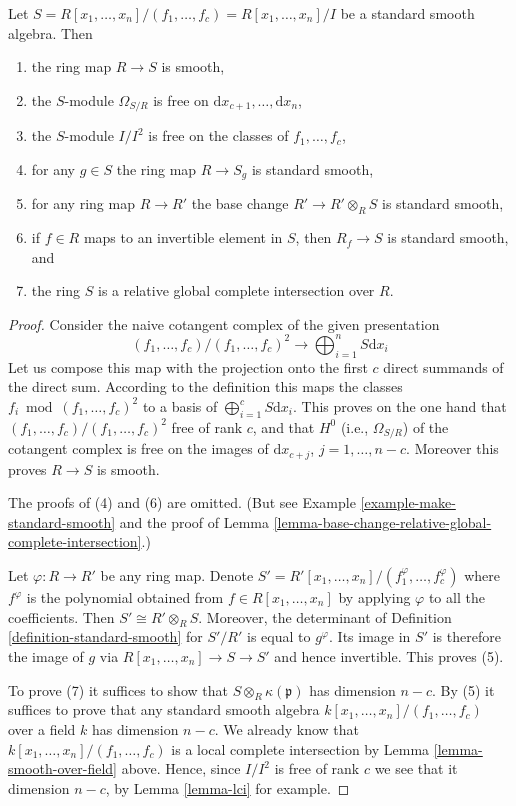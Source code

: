 \begin{lemma}
\label{lemma-standard-smooth}
Let
$S = R[x_1, \ldots, x_n]/(f_1, \ldots, f_c) = R[x_1, \ldots, x_n]/I$
be a standard smooth algebra. Then
\begin{enumerate}
\item the ring map $R \to S$ is smooth,
\item the $S$-module $\Omega_{S/R}$ is free on
$\text{d}x_{c + 1}, \ldots, \text{d}x_n$,
\item the $S$-module $I/I^2$ is free on the classes of $f_1, \ldots, f_c$,
\item for any $g \in S$ the ring map $R \to S_g$ is standard smooth,
\item for any ring map $R \to R'$ the base change
$R' \to R'\otimes_R S$ is standard smooth,
\item if $f \in R$ maps to an invertible element in $S$, then
$R_f \to S$ is standard smooth, and
\item the ring $S$ is a relative global complete intersection over $R$.
\end{enumerate}
\end{lemma}

\begin{proof}
Consider the naive cotangent complex of the given presentation
$$
(f_1, \ldots, f_c)/(f_1, \ldots, f_c)^2
\longrightarrow
\bigoplus\nolimits_{i = 1}^n S \text{d}x_i
$$
Let us compose this map with the projection onto the first $c$ direct summands
of the direct sum. According to the definition this maps the classes
$f_i \bmod (f_1, \ldots, f_c)^2$ to a basis of
$\bigoplus_{i = 1}^c S\text{d}x_i$. This proves on the one hand that
$(f_1, \ldots, f_c)/(f_1, \ldots, f_c)^2$ free of rank $c$, and
that $H^0$ (i.e., $\Omega_{S/R}$) of the cotangent complex is free
on the images of $\text{d}x_{c + j}$, $j = 1, \ldots, n - c$.
Moreover this proves $R \to S$ is smooth.

\medskip\noindent
The proofs of (4) and (6) are omitted. (But see
Example \ref{example-make-standard-smooth} and 
the proof of
Lemma \ref{lemma-base-change-relative-global-complete-intersection}.)

\medskip\noindent
Let $\varphi : R \to R'$ be any ring map.
Denote $S' = R'[x_1, \ldots, x_n]/(f_1^\varphi, \ldots, f_c^\varphi)$
where $f^\varphi$ is the polynomial obtained from $f \in R[x_1, \ldots, x_n]$
by applying $\varphi$ to all the coefficients. Then $S' \cong R' \otimes_R S$.
Moreover, the determinant of Definition \ref{definition-standard-smooth}
for $S'/R'$ is equal to $g^\varphi$. Its image in $S'$ is therefore
the image of $g$ via $R[x_1, \ldots, x_n] \to S \to S'$
and hence invertible. This proves (5).

\medskip\noindent
To prove (7) it suffices to show that
$S \otimes_R \kappa(\mathfrak p)$ has dimension $n - c$.
By (5) it suffices to prove that any standard smooth
algebra $k[x_1, \ldots, x_n]/(f_1, \ldots, f_c)$
over a field $k$ has dimension $n - c$. We already
know that $k[x_1, \ldots, x_n]/(f_1, \ldots, f_c)$ is a local
complete intersection by Lemma \ref{lemma-smooth-over-field} above.
Hence, since $I/I^2$ is free of rank $c$ we see that it dimension
$n - c$, by Lemma \ref{lemma-lci} for example.
\end{proof}

